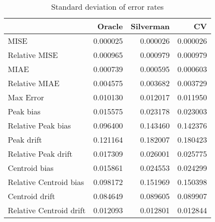 \begin{table}[H]
\centering
\begin{tabular}{lrrr}
  \hline
 & Oracle & Silverman & CV \\ 
  \hline
MISE & 0.000025 & 0.000026 & 0.000026 \\ 
  Relative MISE & 0.000965 & 0.000979 & 0.000979 \\ 
  MIAE & 0.000739 & 0.000595 & 0.000603 \\ 
  Relative MIAE & 0.004575 & 0.003682 & 0.003729 \\ 
  Max Error & 0.010130 & 0.012017 & 0.011950 \\ 
  Peak bias & 0.015575 & 0.023178 & 0.023003 \\ 
  Relative Peak bias & 0.096400 & 0.143460 & 0.142376 \\ 
  Peak drift & 0.121164 & 0.182007 & 0.180423 \\ 
  Relative Peak drift & 0.017309 & 0.026001 & 0.025775 \\ 
  Centroid bias & 0.015861 & 0.024553 & 0.024299 \\ 
  Relative Centroid bias & 0.098172 & 0.151969 & 0.150398 \\ 
  Centroid drift & 0.084649 & 0.089605 & 0.089907 \\ 
  Relative Centroid drift & 0.012093 & 0.012801 & 0.012844 \\ 
   \hline
\end{tabular}
\caption{Standard deviation of error rates} 
\label{tbl:stddev_error_rates}
\end{table}
